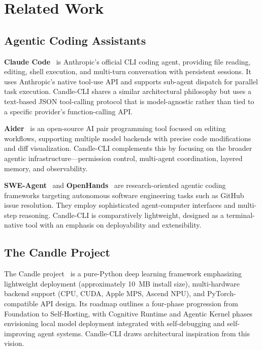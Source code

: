 \documentclass[11pt]{article}
\begin{document}
\section{Related Work}
\label{sec:related}

\subsection{Agentic Coding Assistants}

\textbf{Claude Code}~\cite{claudecode} is Anthropic's official CLI coding agent, providing file reading, editing, shell execution, and multi-turn conversation with persistent sessions. It uses Anthropic's native tool-use API and supports sub-agent dispatch for parallel task execution. Candle-CLI shares a similar architectural philosophy but uses a text-based JSON tool-calling protocol that is model-agnostic rather than tied to a specific provider's function-calling API.

\textbf{Aider}~\cite{aider} is an open-source AI pair programming tool focused on editing workflows, supporting multiple model backends with precise code modifications and diff visualization. Candle-CLI complements this by focusing on the broader agentic infrastructure---permission control, multi-agent coordination, layered memory, and observability.

\textbf{SWE-Agent}~\cite{sweagent} and \textbf{OpenHands}~\cite{openhands} are research-oriented agentic coding frameworks targeting autonomous software engineering tasks such as GitHub issue resolution. They employ sophisticated agent-computer interfaces and multi-step reasoning. Candle-CLI is comparatively lightweight, designed as a terminal-native tool with an emphasis on deployability and extensibility.

\subsection{The Candle Project}

The Candle project~\cite{candle} is a pure-Python deep learning framework emphasizing lightweight deployment (approximately 10~MB install size), multi-hardware backend support (CPU, CUDA, Apple MPS, Ascend NPU), and PyTorch-compatible API design. Its roadmap outlines a four-phase progression from Foundation to Self-Hosting, with Cognitive Runtime and Agentic Kernel phases envisioning local model deployment integrated with self-debugging and self-improving agent systems. Candle-CLI draws architectural inspiration from this vision.
\end{document}
